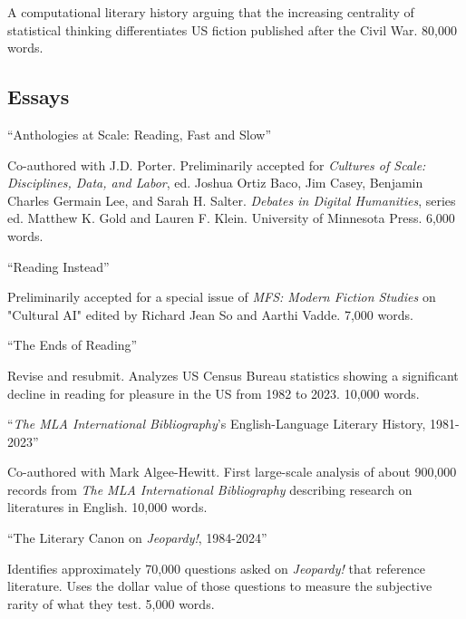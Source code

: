 \documentclass[12pt,letterpaper]{report}
\begin{document}
\smallskip

\tabto{2em} A computational literary history arguing that the increasing centrality of statistical thinking differentiates US fiction published after the Civil War. 80,000 words.

\subsection*{Essays}

\enquote{Anthologies at Scale: Reading, Fast and Slow}

\smallskip

\tabto{2em} Co-authored with J.D. Porter. Preliminarily accepted for \textit{Cultures of Scale: Disciplines, Data, and Labor}, ed. Joshua Ortiz Baco, Jim Casey, Benjamin Charles Germain Lee, and Sarah H. Salter. \textit{Debates in Digital Humanities}, series ed. Matthew K. Gold and Lauren F. Klein. University of Minnesota Press. 6,000 words.

\bigskip

\enquote{Reading Instead}

\smallskip

\tabto{2em} Preliminarily accepted for a special issue of \textit{MFS: Modern Fiction Studies} on "Cultural AI" edited by Richard Jean So and Aarthi Vadde. 7,000 words.

\bigskip

\enquote{The Ends of Reading}

\smallskip

\tabto{2em} Revise and resubmit. Analyzes US Census Bureau statistics showing a significant decline in reading for pleasure in the US from 1982 to 2023. 10,000 words.

\bigskip

\enquote{\emph{The MLA International Bibliography}'s English-Language Literary History, 1981-2023}

\smallskip

\tabto{2em} Co-authored with Mark Algee-Hewitt. First large-scale analysis of about 900,000 records from \textit{The MLA International Bibliography} describing research on literatures in English. 10,000 words.

\bigskip

\enquote{The Literary Canon on \emph{Jeopardy!}, 1984-2024}

\smallskip

\tabto{2em} Identifies approximately 70,000 questions asked on \emph{Jeopardy!} that reference literature. Uses the dollar value of those questions to measure the subjective rarity of what they test. 5,000 words.
\end{document}
